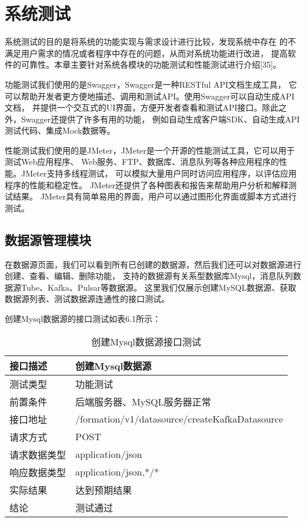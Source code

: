 
\chapter{系统测试}

系统测试的目的是将系统的功能实现与需求设计进行比较，发现系统中存在
的不满足用户需求的情况或者程序中存在的问题，从而对系统功能进行改进，
提高软件的可靠性。本章主要针对系统各模块的功能测试和性能测试进行介绍[35]。

功能测试我们使用的是Swagger，Swagger是一种RESTful API文档生成工具，
它可以帮助开发者更方便地描述、调用和测试API。使用Swagger可以自动生成API文档，
并提供一个交互式的UI界面，方便开发者查看和测试API接口。除此之外，Swagger还提供了许多有用的功能，
例如自动生成客户端SDK、自动生成API测试代码、集成Mock数据等。

性能测试我们使用的是JMeter，JMeter是一个开源的性能测试工具，它可以用于测试Web应用程序、
Web服务、FTP、数据库、消息队列等各种应用程序的性能。JMeter支持多线程测试，
可以模拟大量用户同时访问应用程序，以评估应用程序的性能和稳定性。
JMeter还提供了各种图表和报告来帮助用户分析和解释测试结果。
JMeter具有简单易用的界面，用户可以通过图形化界面或脚本方式进行测试。

\section{数据源管理模块}

在数据源页面，我们可以看到所有已创建的数据源，然后我们还可以对数据源进行创建、查看、编辑、删除功能，
支持的数据源有关系型数据库Mysql，消息队列数据源Tube、Kafka、Pulsar等数据源。
这里我们仅展示创建MySQL数据源、获取数据源列表、测试数据源连通性的接口测试。

创建Mysql数据源的接口测试如表6.1所示：

\begin{table}[h]
  \centering
  \caption{创建Mysql数据源接口测试}
  \label{tab:exampletable}
  \begin{tabular}{ll}
    \toprule
    接口描述         & 创建Mysql数据源          \\
    \midrule
    测试类型         & 功能测试         \\
    前置条件         & 后端服务器、MySQL服务器正常         \\
    接口地址       & /formation/v1/datasource/createKafkaDatasource         \\
    请求方式         & POST      \\
    请求数据类型         & application/json     \\
    响应数据类型         & application/json,*/*           \\
    实际结果         & 达到预期结果           \\
    结论            & 测试通过           \\
    \bottomrule
  \end{tabular}
\end{table}

